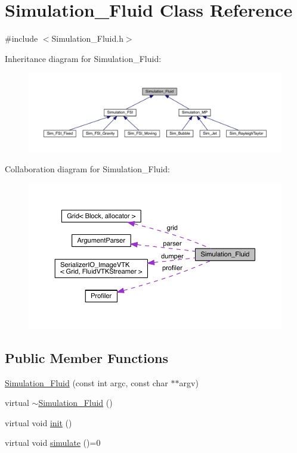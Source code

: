 \hypertarget{class_simulation___fluid}{}\section{Simulation\+\_\+\+Fluid Class Reference}
\label{class_simulation___fluid}


{\ttfamily \#include $<$Simulation\+\_\+\+Fluid.\+h$>$}



Inheritance diagram for Simulation\+\_\+\+Fluid\+:\nopagebreak
\begin{figure}[H]
\begin{center}
\leavevmode
\includegraphics[width=350pt]{d1/d38/class_simulation___fluid__inherit__graph}
\end{center}
\end{figure}


Collaboration diagram for Simulation\+\_\+\+Fluid\+:\nopagebreak
\begin{figure}[H]
\begin{center}
\leavevmode
\includegraphics[width=350pt]{d0/d06/class_simulation___fluid__coll__graph}
\end{center}
\end{figure}
\subsection*{Public Member Functions}
\begin{DoxyCompactItemize}
\item 
\hyperlink{class_simulation___fluid_ad06473e56135a5423660fe985380086c}{Simulation\+\_\+\+Fluid} (const int argc, const char $\ast$$\ast$argv)
\item 
virtual \hyperlink{class_simulation___fluid_a149b5d59753ed87c23793ce27e4b09cb}{$\sim$\+Simulation\+\_\+\+Fluid} ()
\item 
virtual void \hyperlink{class_simulation___fluid_a86324788163a191e09a90ff35471604e}{init} ()
\item 
virtual void \hyperlink{class_simulation___fluid_a81e2754617245ce69346272181a5de78}{simulate} ()=0
\end{DoxyCompactItemize}
